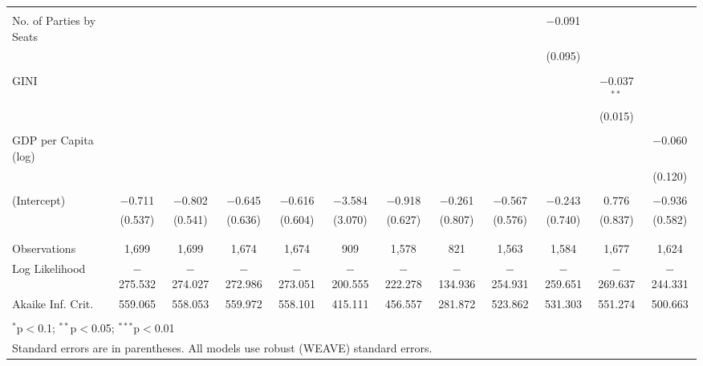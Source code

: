 \documentclass[a4paper]{article}\usepackage[]{graphicx}\usepackage[]{color}
\begin{document}
\begin{table}[H]
\begin{center}
{{\begin{tabular}{@{\extracolsep{5pt}}lccccccccccc}
  & & & & & & & & & & & \\ 
 No. of Parties by Seats &  &  &  &  &  &  &  &  & $-$0.091 &  &  \\ 
  &  &  &  &  &  &  &  &  & (0.095) &  &  \\ 
  & & & & & & & & & & & \\ 
 GINI &  &  &  &  &  &  &  &  &  & $-$0.037$^{**}$ &  \\ 
  &  &  &  &  &  &  &  &  &  & (0.015) &  \\ 
  & & & & & & & & & & & \\ 
 GDP per Capita (log) &  &  &  &  &  &  &  &  &  &  & $-$0.060 \\ 
  &  &  &  &  &  &  &  &  &  &  & (0.120) \\ 
  & & & & & & & & & & & \\ 
 (Intercept) & $-$0.711 & $-$0.802 & $-$0.645 & $-$0.616 & $-$3.584 & $-$0.918 & $-$0.261 & $-$0.567 & $-$0.243 & 0.776 & $-$0.936 \\ 
  & (0.537) & (0.541) & (0.636) & (0.604) & (3.070) & (0.627) & (0.807) & (0.576) & (0.740) & (0.837) & (0.582) \\ 
  & & & & & & & & & & & \\ 
\hline \\[-1.8ex] 
Observations & 1,699 & 1,699 & 1,674 & 1,674 & 909 & 1,578 & 821 & 1,563 & 1,584 & 1,677 & 1,624 \\ 
Log Likelihood & $-$275.532 & $-$274.027 & $-$272.986 & $-$273.051 & $-$200.555 & $-$222.278 & $-$134.936 & $-$254.931 & $-$259.651 & $-$269.637 & $-$244.331 \\ 
Akaike Inf. Crit. & 559.065 & 558.053 & 559.972 & 558.101 & 415.111 & 456.557 & 281.872 & 523.862 & 531.303 & 551.274 & 500.663 \\ 
\hline 
\hline \\[-1.8ex] 
\multicolumn{12}{l}{$^{*}$p$<$0.1; $^{**}$p$<$0.05; $^{***}$p$<$0.01} \\ 
\multicolumn{12}{l}{Standard errors are in parentheses. All models use robust (WEAVE) standard errors.} \\ 
\end{tabular} 

}}
\end{center}

\end{table}
\end{document}
